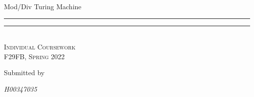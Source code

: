 \documentclass[a4paper]{article} %
\newlength{\drop}
\begin{document}
    \begin{titlepage}
        \textheight
        \centering
        \vspace*{\baselineskip}
        {\LARGE Mod/Div Turing Machine }\\[0.2\baselineskip]
        \rule{\textwidth}{0.4pt}\vspace*{-\baselineskip}\vspace{3.2pt}
        \rule{\textwidth}{1.6pt}\\[\baselineskip]
        \scshape
        Individual Coursework\\
        F29FB, Spring 2022\par
        \vfill
        Submitted by \\[\baselineskip]
        {\itshape H00347035\par}
        \vspace*{8\baselineskip}
    \end{titlepage}
\end{document}
